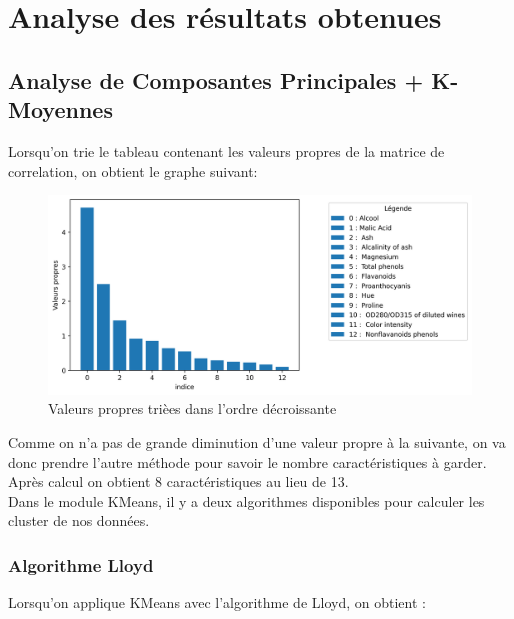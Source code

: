 \documentclass[a4paper,12pt]{article}
\begin{document}
\newpage

\section{Analyse des résultats obtenues}
\label{sec:analyse}

\subsection{Analyse de Composantes Principales + K-Moyennes}

Lorsqu'on trie le tableau contenant les valeurs propres de la matrice de correlation, on obtient le graphe suivant: \\

\newpage

\begin{figure}[h!] %
   \centering
   \includegraphics[width=1\textwidth]{vp.png} %
   \caption{Valeurs propres trièes dans l'ordre décroissante}
   \label{fig:vp} %
\end{figure}  
             
Comme on n'a pas de grande diminution d'une valeur propre à la suivante, on va donc prendre l'autre méthode pour savoir le nombre caractéristiques à garder. Après calcul on obtient 8 caractéristiques au lieu de 13.\\

Dans le module KMeans, il y a deux algorithmes disponibles pour calculer les cluster de nos données.

\subsubsection{Algorithme Lloyd}

Lorsqu'on applique KMeans avec l'algorithme de Lloyd, on obtient :
\end{document}
